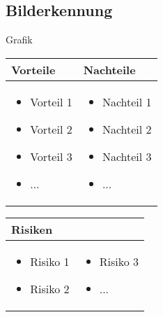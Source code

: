 \pagebreak


\subsection{Bilderkennung}
Grafik

\begin{table}[h]
\begin{tabular}{p{} | p{}}


 \textbf{Vorteile} & \textbf{Nachteile} \\ \hline
	 
\begin{itemize}
\item Vorteil 1
\item Vorteil 2
\item Vorteil 3
\item ...
\end{itemize}

 
 &
 
\begin{itemize}
\item Nachteil 1
\item Nachteil 2
\item Nachteil 3
\item ...
\end{itemize}

\end{tabular}
\end{table}

\begin{table}[h]
\begin{tabular}{p{}p{}}


 \textbf{Risiken} & \\ \hline
	 
\begin{itemize}
\item Risiko 1
\item Risiko 2
\end{itemize}
&
\begin{itemize}
\item Risiko 3
\item ...
\end{itemize}

 
\end{tabular}
\end{table}

\pagebreak